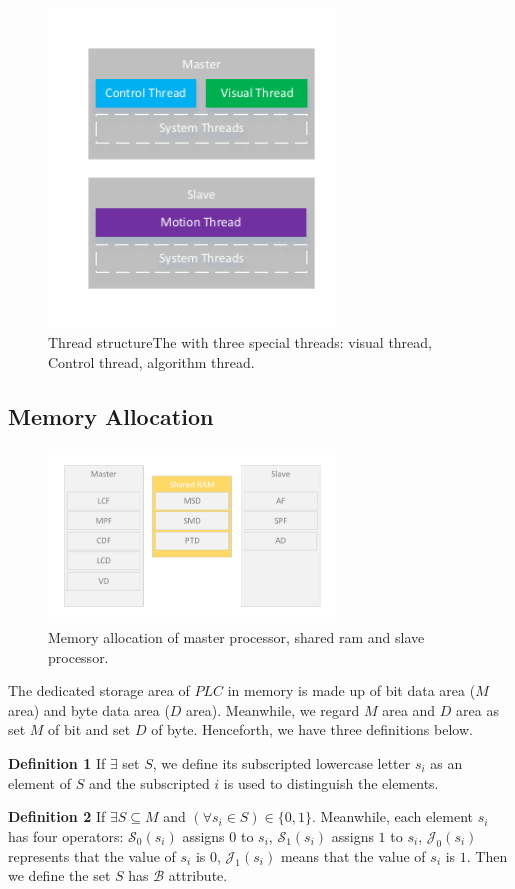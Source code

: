 \documentclass[journal,UTF8]{IEEEtran}
\begin{document}
\begin{figure}
	\centering
	\includegraphics[width=3in]{fig/Threads.pdf}
	\caption{ Thread structureThe with three special threads: visual thread, Control thread, algorithm thread.}
	\label{fig:Threads}
\end{figure}
\subsection{Memory Allocation}
\begin{figure}
	\centering
	\includegraphics[width=3in]{fig/RAM.pdf}
	\caption{Memory allocation of master processor, shared ram and slave processor.}
	\label{fig:RAM}
\end{figure}
The dedicated storage area of $PLC$ in memory is made up of bit data area ($M$ area) and byte data area ($D$ area). Meanwhile, we regard $M$ area and $D$ area as set $M$ of bit and set $D$ of byte. Henceforth, we have three definitions below.

\textbf{Definition 1} If $\exists$ set $S$, we define its subscripted lowercase letter $s_i$ as an element of $S$ and the subscripted $i$ is used to distinguish the elements.

\textbf{Definition 2} If $\exists S \subseteq M$ and $(\forall s_{i} \in S) \in \{0, 1\} $. Meanwhile, each element $s_i$ has four operators: $\mathcal{S}_0(s_i)$ assigns $0$ to $s_i$, $\mathcal{S}_1(s_i)$ assigns $1$ to $s_i$, $\mathcal{J}_0(s_i)$ represents that the value of $s_i$ is $0$, $\mathcal{J}_1(s_i)$ means that the value of $s_i$ is $1$. Then we define the set $S$ has $\mathcal{B}$ attribute.
\end{document}
